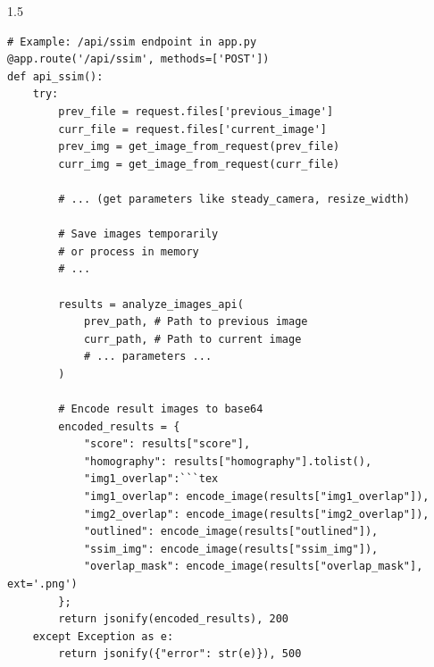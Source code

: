 \documentclass[12pt,a4paper]{report}
\begin{document}
\begin{spacing}{1.5}
    \begin{listing}[H]
        \begin{verbatim}
# Example: /api/ssim endpoint in app.py
@app.route('/api/ssim', methods=['POST'])
def api_ssim():
    try:
        prev_file = request.files['previous_image']
        curr_file = request.files['current_image']
        prev_img = get_image_from_request(prev_file)
        curr_img = get_image_from_request(curr_file)

        # ... (get parameters like steady_camera, resize_width)

        # Save images temporarily
        # or process in memory
        # ...

        results = analyze_images_api(
            prev_path, # Path to previous image
            curr_path, # Path to current image
            # ... parameters ...
        )

        # Encode result images to base64
        encoded_results = {
            "score": results["score"],
            "homography": results["homography"].tolist(),
            "img1_overlap":```tex
            "img1_overlap": encode_image(results["img1_overlap"]),
            "img2_overlap": encode_image(results["img2_overlap"]),
            "outlined": encode_image(results["outlined"]),
            "ssim_img": encode_image(results["ssim_img"]),
            "overlap_mask": encode_image(results["overlap_mask"], ext='.png')
        };
        return jsonify(encoded_results), 200
    except Exception as e:
        return jsonify({"error": str(e)}), 500
        \end{verbatim}
        \caption{Flask SSIM API Endpoint Snippet}
        \label{lst:flask_ssim}
    \end{listing}


\end{spacing}
\end{document}
